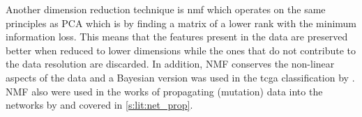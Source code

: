 Another dimension reduction technique is \acrfull{nmf} which operates on the same principles as PCA which is by finding a matrix of a lower rank with the minimum information loss. This means that the features present in the data are preserved better when reduced to lower dimensions while the ones that do not contribute to the data resolution are discarded. In addition, NMF conserves the non-linear aspects of the data and a Bayesian version was used in the \acrfull{tcga} classification by \citet{Robertson2017-mg}. NMF also were used in the works of propagating (mutation) data into the networks by \citet{Yang2016-dm, Cai2008-fv} and covered in \cref{s:lit:net_prop}.






